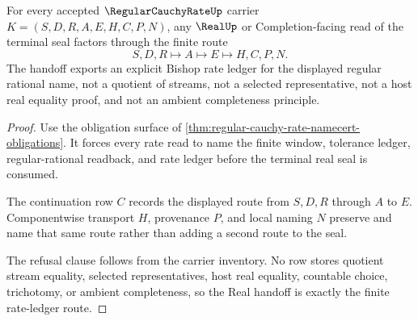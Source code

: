 \begin{theorem}
\label{thm:regular-cauchy-rate-real-handoff}
For every accepted $\RegularCauchyRateUp$ carrier $K=(S,D,R,A,E,H,C,P,N)$, any $\RealUp$ or Completion-facing read of the terminal seal factors through the finite route
$$
S,D,R \longmapsto A \longmapsto E \longmapsto H,C,P,N .
$$
The handoff exports an explicit Bishop rate ledger for the displayed regular rational name, not a quotient of streams, not a selected representative, not a host real equality proof, and not an ambient completeness principle.
\end{theorem}
\begin{proof}
Use the obligation surface of \autoref{thm:regular-cauchy-rate-namecert-obligations}. It forces every rate read to name the finite window, tolerance ledger, regular-rational readback, and rate ledger before the terminal real seal is consumed.

The continuation row $C$ records the displayed route from $S,D,R$ through $A$ to $E$. Componentwise transport $H$, provenance $P$, and local naming $N$ preserve and name that same route rather than adding a second route to the seal.

The refusal clause follows from the carrier inventory. No row stores quotient stream equality, selected representatives, host real equality, countable choice, trichotomy, or ambient completeness, so the Real handoff is exactly the finite rate-ledger route.
\end{proof}

